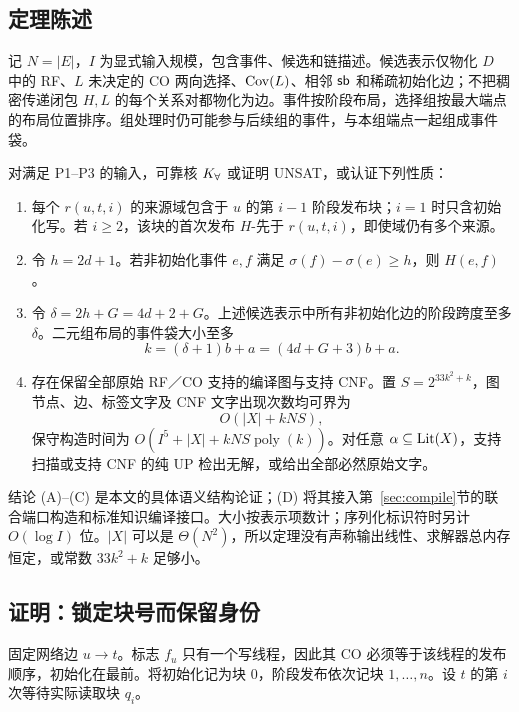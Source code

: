 \subsection{定理陈述}
记 $N=|E|$，$I$ 为显式输入规模，包含事件、候选和链描述。候选表示仅物化 $D$ 中的 RF、$L$ 未决定的 CO 两向选择、$\mathop{\mathrm{Cov}}(L)$、相邻 $\mathsf{sb}$ 和稀疏初始化边；不把稠密传递闭包 $H,L$ 的每个关系对都物化为边。事件按阶段布局，选择组按最大端点的布局位置排序。组处理时仍可能参与后续组的事件，与本组端点一起组成事件袋。

\begin{cthm}[来源未定发布网络的局部化]\label{thm:main}
对满足 P1--P3 的输入，可靠核 $K_{\forall}$ 或证明 UNSAT，或认证下列性质：
\begin{enumerate}[label=(\Alph*)]
\item 每个 $r(u,t,i)$ 的来源域包含于 $u$ 的第 $i-1$ 阶段发布块；$i=1$ 时只含初始化写。若 $i\ge2$，该块的首次发布 $H$-先于 $r(u,t,i)$，即使域仍有多个来源。
\item 令 $h=2d+1$。若非初始化事件 $e,f$ 满足 $\sigma(f)-\sigma(e)\ge h$，则 $H(e,f)$。
\item 令 $\delta=2h+G=4d+2+G$。上述候选表示中所有非初始化边的阶段跨度至多 $\delta$。二元组布局的事件袋大小至多
\begin{equation}
 k=(\delta+1)b+a=(4d+G+3)b+a.\label{eq:k}
\end{equation}
\item 存在保留全部原始 RF／CO 支持的编译图与支持 CNF。置 $S=2^{33k^2+k}$，图节点、边、标签文字及 CNF 文字出现次数均可界为
\begin{equation}
 O(|X|+kNS),\label{eq:size}
\end{equation}
保守构造时间为 $O(I^5+|X|+kNS\operatorname{poly}(k))$。对任意 $\alpha\subseteq\mathop{\mathrm{Lit}}(X)$，支持扫描或支持 CNF 的纯 UP 检出无解，或给出全部必然原始文字。
\end{enumerate}
\end{cthm}

结论 (A)--(C) 是本文的具体语义结构论证；(D) 将其接入第~\ref{sec:compile}节的联合端口构造和标准知识编译接口。大小按表示项数计；序列化标识符时另计 $O(\log I)$ 位。$|X|$ 可以是 $\Theta(N^2)$，所以定理没有声称输出线性、求解器总内存恒定，或常数 $33k^2+k$ 足够小。

\subsection{证明：锁定块号而保留身份}
固定网络边 $u\to t$。标志 $f_u$ 只有一个写线程，因此其 CO 必须等于该线程的发布顺序，初始化在最前。将初始化记为块 0，阶段发布依次记块 $1,\ldots,n$。设 $t$ 的第 $i$ 次等待实际读取块 $q_i$。

